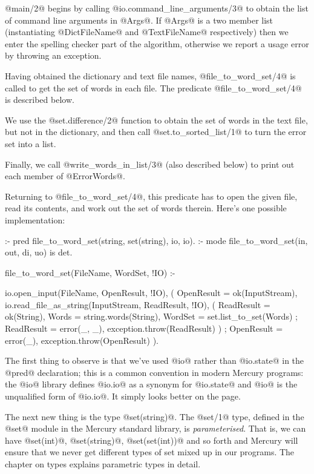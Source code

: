 @main/2@ begins by calling @io.command_line_arguments/3@ to obtain the
list of command line arguments in @Args@.  If @Args@ is a two member
list (instantiating @DictFileName@ and @TextFileName@ respectively) then we
enter the spelling checker part of the algorithm, otherwise we report a
usage error by throwing an exception.

Having obtained the dictionary and text file names, @file_to_word_set/4@
is called to get the set of words in each file.  The predicate
@file_to_word_set/4@ is described below.

We use the @set.difference/2@ function to obtain the set of words in the
text file, but not in the dictionary, and then call
@set.to_sorted_list/1@ to turn the error set into a list.

Finally, we call @write_words_in_list/3@ (also described below) to print out
each member of @ErrorWords@.

Returning to @file_to_word_set/4@, this predicate has to open the given
file, read its contents, and work out the set of words therein.  Here's
one possible implementation:
\begin{myverbatim}
:- pred file_to_word_set(string, set(string), io, io).
:- mode file_to_word_set(in,     out,         di, uo) is det.

file_to_word_set(FileName, WordSet, !IO) :-

    io.open_input(FileName, OpenResult, !IO),
    (
        OpenResult = ok(InputStream),
        io.read_file_as_string(InputStream, ReadResult, !IO),
        (
            ReadResult = ok(String),
            Words      = string.words(String),
            WordSet    = set.list_to_set(Words)
        ;
            ReadResult = error(_, _),
            exception.throw(ReadResult)
        )
    ;
        OpenResult = error(_),
        exception.throw(OpenResult)
    ).
\end{myverbatim}
The first thing to observe is that we've used @io@ rather than
@io.state@ in the @pred@ declaration; this is a common convention in
modern Mercury programs: the @io@ library defines @io.io@ as a
synonym for @io.state@ and @io@ is the unqualified form of @io.io@.  It
simply looks better on the page.

The next new thing is the type @set(string)@.  The @set/1@ type, defined
in the @set@ module in the Mercury standard library, is
\emph{parameterised}.  That is, we can have @set(int)@, @set(string)@,
@set(set(int))@ and so forth and Mercury will ensure that we never get
different types of set mixed up in our programs.  The chapter on types
\XXX{} explains parametric types in detail.

